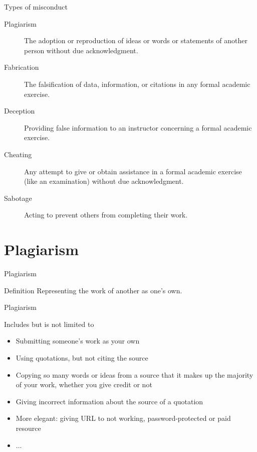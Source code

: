 	\begin{frame}{Types of misconduct}

		\begin{description}
			\item[Plagiarism]
				The adoption or reproduction of ideas or words or statements of another person without due acknowledgment.
			\item[Fabrication]
				The falsification of data, information, or citations in any formal academic exercise.
			\item[Deception]
				Providing false information to an instructor concerning a formal academic exercise.
			\item[Cheating]
				Any attempt to give or obtain assistance in a formal academic exercise (like an examination) without due acknowledgment.
			\item[Sabotage]
				Acting to prevent others from completing their work.
		\end{description}

	\end{frame}

\section{Plagiarism}

	\begin{frame}{Plagiarism}
		
		\begin{block}{Definition}
			Representing the work of another as one’s own.
		\end{block}	

	\end{frame}

	\begin{frame}{Plagiarism}
		
		Includes but is not limited to

		\begin{itemize}
			\item 
				Submitting someone's work as your own
			\item 
				Using quotations, but not citing the source
			\item 
				Copying so many words or ideas from a source that it makes up the majority of your work, whether you give credit or not
			\item 
				Giving incorrect information about the source of a quotation
			\item 
				More elegant: giving URL to not working, password-protected or paid resource
			\item 
				$\ldots$
		\end{itemize}

	\end{frame}

